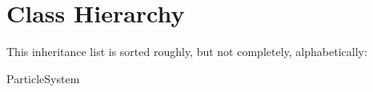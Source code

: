 \section{Class Hierarchy}
This inheritance list is sorted roughly, but not completely, alphabetically\+:\begin{DoxyCompactList}
\item {}
\item Particle\+System\begin{DoxyCompactList}
\item {}
\end{DoxyCompactList}
\item {}
\item {}
\item {}
\end{DoxyCompactList}
